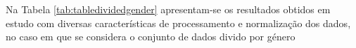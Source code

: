 \documentclass[12pt,a4paper,twoside]{report}
\begin{document}
{Na Tabela \ref{tab:tabledividedgender} apresentam-se os resultados obtidos em estudo com diversas características de processamento e normalização dos dados, no caso em que se considera o conjunto de dados divido por género

}
\end{document}
